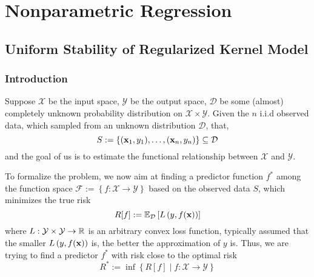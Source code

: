 \chapter{Nonparametric Regression}

\section{Uniform Stability of Regularized Kernel Model}

\subsection{Introduction}

Suppose $\mathcal{X}$ be the input space, $\mathcal{Y}$ be the output space, $\mathcal{D}$ be some (almost) completely unknown probability distribution on $\mathcal{X}\times\mathcal{Y}$. Given the $n$ i.i.d observed data, which sampled from an unknown distribution $\mathcal{D}$, that,
\begin{equation}
	S:=\left\{({\bf x}_{1},y_{1}),\ldots,({\bf x}_{n},y_{n})\right\}\subseteq\mathcal{D}
\end{equation}
and the goal of us is to estimate the functional relationship between $\mathcal{X}$ and $\mathcal{Y}$.

To formalize the problem, we now aim at finding a predictor function $f^{*}$ among the function space $\mathcal{F}:=\left\{f:\mathcal{X}\rightarrow\mathcal{Y}\right\}$ based on the observed data $S$, which minimizes the true risk
\begin{equation} \label{eq:true-risk}
	R[f]:={\mathbb E}_{\mathcal{D}}\left[L\left(y,f({\bf x})\right)\right]
\end{equation}
where $L:\mathcal{Y}\times\mathcal{Y}\rightarrow{\mathbb R}$ is an arbitrary convex loss function, typically assumed that the smaller $L\left(y,f({\bf x})\right)$ is, the better the approximation of $y$ is. Thus, we are trying to find a predictor $f^{*}$ with risk close to the optimal risk
\begin{equation}
	R^{*}:=\inf\left\{R[f]\mid f:\mathcal{X}\rightarrow\mathcal{Y}\right\}
\end{equation}

